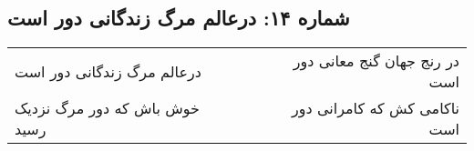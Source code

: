 \begin{center}
\section*{شماره ۱۴: درعالم مرگ زندگانی دور است}
\label{sec:014}
\begin{longtable}{l p{0.5cm} r}
درعالم مرگ زندگانی دور است
&&
در رنج جهان گنج معانی دور است
\\
خوش باش که دور مرگ نزدیک رسید
&&
ناکامی کش که کامرانی دور است
\\
\end{longtable}
\end{center}
